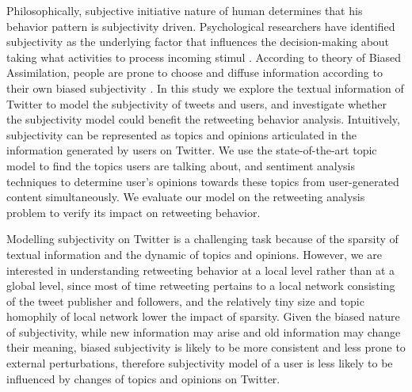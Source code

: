 \documentclass[smallcondensed]{svjour3}     %
\begin{document}
Philosophically, subjective initiative nature of human determines that his behavior pattern is subjectivity driven.
Psychological researchers have identified subjectivity as the underlying factor that influences the decision-making about taking what activities to process incoming stimul \cite{Moore2008}.
According to theory of Biased Assimilation, people are prone to choose and diffuse information according to their own biased subjectivity \cite{Hyman2000,sunstein2009rumors}. 
In this study we explore the textual information of Twitter to model the subjectivity of tweets and users, and investigate whether the subjectivity model  could benefit the retweeting behavior analysis. 
Intuitively, subjectivity can be represented as topics and opinions articulated in the information generated by users on Twitter.
We use the state-of-the-art topic model to find the topics users are talking about, and sentiment analysis techniques to determine user’s opinions towards these topics from user-generated content simultaneously. 
We evaluate our model on the retweeting analysis problem to verify its impact on retweeting behavior.

Modelling subjectivity on Twitter is a challenging task because of the sparsity of textual information and the dynamic of topics and opinions.
However, we are interested in understanding retweeting behavior at a local level rather than at a global level, since most of time retweeting pertains to a local network consisting of the tweet publisher and followers, and the relatively tiny size and topic homophily of local network lower the impact of sparsity.
Given the biased nature of subjectivity, while new information may arise and old information may change their meaning, biased subjectivity is likely to be more consistent and less prone to external perturbations, therefore subjectivity model  of a user is less likely to be influenced by changes of topics and opinions on Twitter.
 
\end{document}
